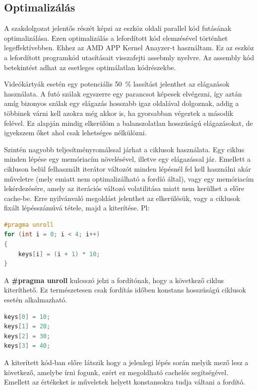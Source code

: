 \subsection{Optimalizálás}

A szakdolgozat jelentős részét képzi az eszköz oldali parallel kód futásának optimalizálása. Ezen optimalizálás a lefordított kód elemzésével történhet legeffektívebben. Ehhez az AMD APP Kernel Anayzer-t használtam. Ez az eszköz a lefordított programkód utasításait visszafejti assebmly nyelvre. Az assembly kód betekintést adhat az esetleges optimálatlan kódrészekbe. 

Videókártyák esetén egy potenciális \SI{50}{\percent} lassítást jelenthet az elágazások használata. A futó szálak egyszerre egy parancsot képesek elvégezni, így aztán amíg bizonyos szálak egy elágazás hosszabb igaz oldalával dolgoznak, addig a többinek várni kell azokra még akkor is, ha gyorsabban végeztek a második felével. Ez alapján mindig elkerülöm a balanszolatlan hosszúságú elágazásokat, de igyekszem őket ahol csak lehetséges nélkülözni.

Szintén nagyobb teljesítményromálssal járhat a ciklusok használata. Egy ciklus minden lépése egy memóriacím növelésével, illetve egy elágazással jár. Emellett a cikluson belül felhasznált iterátor változót minden lépésnél fel kell használni akár műveletre (mely emiatt nem optimalizálható a fordíó által), vagy egy memóriacím lekérdezésére, amely az iterációs változó volatilitása miatt nem kerülhet a előre cache-be. Erre nyilvánvaló megoldást jelenthet az elkerülésük, vagy a ciklusok fixált lépésszámúvá tétele, majd a kiterítése. Pl:


\begin{lstlisting}[language={C++}]
#pragma unroll
for (int i = 0; i < 4; i++)
{
    keys[i] = (i + 1) * 10;
}
\end{lstlisting}


A \textbf{\#pragma unroll} kulcsszó jelzi a fordítónak, hogy a következő ciklus kiteríthető. Ez természetesen csak fordítás időben konstans hosszúságú ciklusok esetén alkalmazható.


\begin{lstlisting}[language={C++}]
keys[0] = 10;
keys[1] = 20;
keys[2] = 30;
keys[3] = 40;
\end{lstlisting}


A kiterített kód-ban előre látszik hogy a jelenlegi lépés során melyik mező lesz a következő, amelybe írni fogunk, ezért ez megoldható cachelés segítségével. Emellett az értékeket is műveletek helyett konstansokra tudja váltani a fordító.










